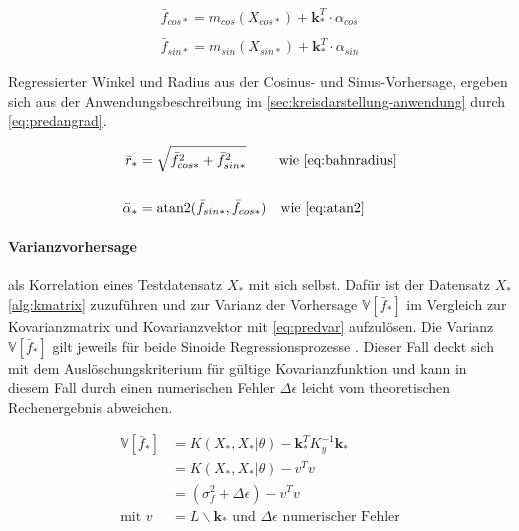 \begin{align}\label{eq:predmean}
	\bar{f}_{cos*} = m_{cos}(X_{cos*}) + \mathbf{k}_*^T \cdot \alpha_{cos} \nonumber \\
	\\
	\bar{f}_{sin*} = m_{sin}(X_{sin*}) + \mathbf{k}_*^T \cdot \alpha_{sin} \nonumber
\end{align}


Regressierter Winkel und Radius aus der Cosinus- und Sinus-Vorhersage, ergeben sich aus der Anwendungsbeschreibung im \autoref{sec:kreisdarstellung-anwendung} durch \autoref{eq:predangrad}.


\begin{align}\label{eq:predangrad}
	\bar{r}_* &= \sqrt{\bar{f}_{cos*}^2 + \bar{f}_{sin*}^2} \quad\quad\ \text{wie \autoref{eq:bahnradius}} \nonumber \\
	\\
	\bar{\alpha}_* &= \text{atan2}(\bar{f}_{sin*}, \bar{f}_{cos*}) \quad \text{wie \autoref{eq:atan2}} \nonumber
\end{align}


\paragraph*{Varianzvorhersage} als Korrelation eines Testdatensatz $X_*$ mit sich selbst. Dafür ist der Datensatz $X_*$ \autoref{alg:kmatrix} zuzuführen und zur Varianz der Vorhersage
$\mathbb{V}\left[ \bar{f}_* \right]$ im Vergleich zur Kovarianzmatrix und Kovarianzvektor mit \autoref{eq:predvar} aufzulösen. Die Varianz $\mathbb{V}\left[ \bar{f}_* \right]$ gilt jeweils für beide Sinoide Regressionsprozesse \cite{Rasmussen2006}. Dieser Fall deckt sich mit dem Auslöschungskriterium für gültige Kovarianzfunktion und kann in diesem Fall durch einen numerischen Fehler $\Delta\epsilon$ leicht vom theoretischen Rechenergebnis abweichen.


\begin{align}\label{eq:predvar}
	\mathbb{V}\left[ \bar{f}_* \right] &= K(X_*, X_*|\theta) - \mathbf{k}_*^T K_y^{-1} \mathbf{k}_* \nonumber \\
									   &= K(X_*, X_*|\theta) - v^T v \\
									   &= (\sigma_f^2 + \Delta\epsilon) - v^T v \nonumber \\
						 \text{mit } v &= L \backslash \mathbf{k}_* \text{ und } \Delta\epsilon \text{ numerischer Fehler} \nonumber
\end{align}


\clearpage


